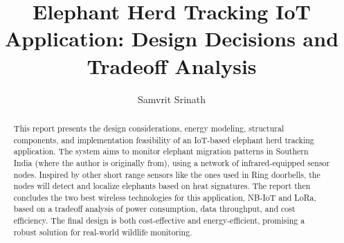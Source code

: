 \documentclass[sigconf,letterpaper,10pt,nonacm]{acmart}
\begin{document}
\title{Elephant Herd Tracking IoT Application: Design Decisions and Tradeoff Analysis}
\author{Samvrit Srinath}

\begin{abstract}
    This report presents the design considerations, energy modeling, structural components, and implementation feasibility of an IoT-based elephant herd tracking application. The system aims to monitor elephant migration patterns in Southern India (where the author is originally from), using a network of infrared-equipped sensor nodes. Inspired by other short range sensors like the ones used in Ring doorbells, the nodes will detect and localize elephants based on heat signatures. The report then concludes the two best wireless technologies for this application, NB-IoT and LoRa, based on a tradeoff analysis of power consumption, data throughput, and cost efficiency. The final design is both cost-effective and energy-efficient, promising a robust solution for real-world wildlife monitoring.
\end{abstract}

\maketitle


% 
% 
% 








\end{document}
